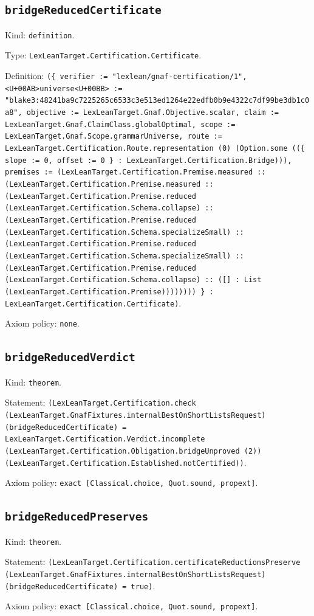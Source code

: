 \documentclass[11pt]{article}
\begin{document}
\subsection*{\texttt{bridgeReducedCertificate}}
\noindent Kind: \texttt{definition}.\par
\noindent Type: \texttt{LexLeanTarget.Certification.Certificate}.\par
\noindent Definition: \texttt{(\{ verifier := "lexlean/gnaf-certification/1", <U+00AB>universe<U+00BB> := "blake3:48241ba9c7225265c6533c3e513ed1264e22edfb0b9e4322c7df99be3db1c0a8", objective := LexLeanTarget.Gnaf.Objective.scalar, claim := LexLeanTarget.Gnaf.ClaimClass.globalOptimal, scope := LexLeanTarget.Gnaf.Scope.grammarUniverse, route := LexLeanTarget.Certification.Route.representation (0) (Option.some ((\{ slope := 0, offset := 0 \} : LexLeanTarget.Certification.Bridge))), premises := (LexLeanTarget.Certification.Premise.measured :: (LexLeanTarget.Certification.Premise.measured :: (LexLeanTarget.Certification.Premise.reduced (LexLeanTarget.Certification.Schema.collapse) :: (LexLeanTarget.Certification.Premise.reduced (LexLeanTarget.Certification.Schema.specializeSmall) :: (LexLeanTarget.Certification.Premise.reduced (LexLeanTarget.Certification.Schema.specializeSmall) :: (LexLeanTarget.Certification.Premise.reduced (LexLeanTarget.Certification.Schema.collapse) :: ([] : List (LexLeanTarget.Certification.Premise)))))))) \} : LexLeanTarget.Certification.Certificate)}.\par
\noindent Axiom policy: \texttt{none}.\par
\subsection*{\texttt{bridgeReducedVerdict}}
\noindent Kind: \texttt{theorem}.\par
\noindent Statement: \texttt{(LexLeanTarget.Certification.check (LexLeanTarget.GnafFixtures.internalBestOnShortListsRequest) (bridgeReducedCertificate) = LexLeanTarget.Certification.Verdict.incomplete (LexLeanTarget.Certification.Obligation.bridgeUnproved (2)) (LexLeanTarget.Certification.Established.notCertified))}.\par
\noindent Axiom policy: \texttt{exact [Classical.choice, Quot.sound, propext]}.\par
\subsection*{\texttt{bridgeReducedPreserves}}
\noindent Kind: \texttt{theorem}.\par
\noindent Statement: \texttt{(LexLeanTarget.Certification.certificateReductionsPreserve (LexLeanTarget.GnafFixtures.internalBestOnShortListsRequest) (bridgeReducedCertificate) = true)}.\par
\noindent Axiom policy: \texttt{exact [Classical.choice, Quot.sound, propext]}.\par
\end{document}
